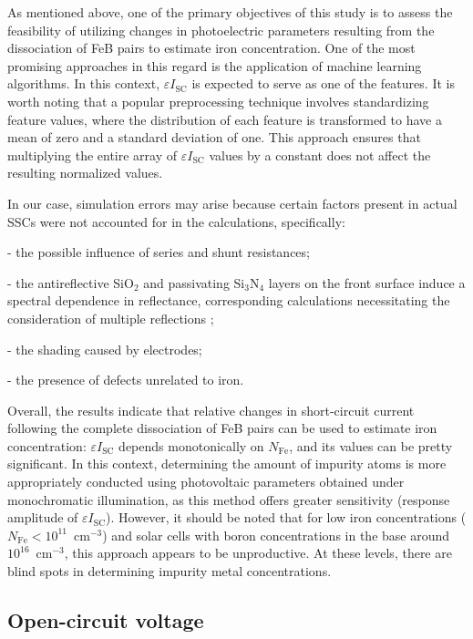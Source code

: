 \documentclass[a4paper,fleqn]{cas-sc}
\begin{document}
As mentioned above, one of the primary objectives of this study is to assess the feasibility of utilizing
changes in photoelectric parameters resulting from the dissociation of FeB pairs to estimate iron concentration.
One of the most promising approaches in this regard is the application of machine learning algorithms.
In this context, $\varepsilon I_\mathrm{SC}$ is expected to serve as one of the features.
It is worth noting that a popular preprocessing technique involves standardizing feature values,
where the distribution of each feature is transformed to have a mean of zero and a standard deviation of one.
This approach ensures that multiplying the entire array of $\varepsilon I_\mathrm{SC}$ values by a constant does not affect the resulting normalized values.

In our case, simulation errors may arise because certain factors present in actual SSCs were not accounted for in the calculations, specifically:

\noindent
- the possible influence of series and shunt resistances;

\noindent
- the antireflective SiO$_2$ and passivating Si$_3$N$_4$ layers on the front surface induce a spectral dependence in reflectance, corresponding calculations necessitating the consideration of multiple reflections \cite{KostRefl2000};

\noindent
- the shading caused by electrodes;

\noindent
- the presence of defects unrelated to iron.


Overall, the results indicate that relative changes in short-circuit current following the complete dissociation of FeB pairs
can be used to estimate iron concentration:
$\varepsilon I_\mathrm{SC}$ depends monotonically on $N_\mathrm{Fe}$, and its values can be pretty significant.
In this context, determining the amount of impurity atoms is more appropriately conducted
using photovoltaic parameters obtained under monochromatic illumination,
as this method offers greater sensitivity (response amplitude of $\varepsilon I_\mathrm{SC}$).
However, it should be noted that for low iron concentrations ($N_\mathrm{Fe}<10^{11}$~cm$^{-3}$)
and solar cells with boron concentrations in the base around $10^{16}$~cm$^{-3}$,
this approach appears to be unproductive.
At these levels, there are blind spots in determining impurity metal concentrations.


\subsection{Open-circuit voltage}
\end{document}
